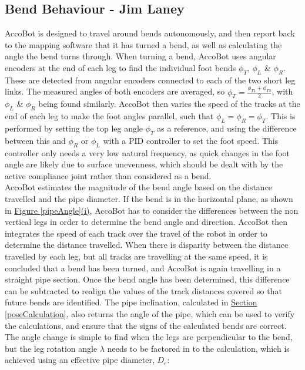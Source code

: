 \documentclass[11pt]{article}		%
\newcommand{\sectref}[1]{\hyperref[#1]{Section \ref*{#1}}}     %
\begin{document}
		\subsection[Bend Behaviour]{Bend Behaviour - Jim Laney}
			
			\begin{floatingfigure}[r]{0pt} \end{floatingfigure}
			AccoBot is designed to travel around bends autonomously, and then report back to the mapping software that it has turned a bend, as well as calculating the angle the bend turns through.
			When turning a bend, AccoBot uses angular encoders at the end of each leg to find the individual foot bends $\phi_T$, $\phi_L$ \& $\phi_R$.
			These are detected from angular encoders connected to each of the two short leg links.
			The measured angles of both encoders are averaged, so $\phi_T = \frac{\phi_{T1} + \phi_{T2}}{2}$, with $\phi_L$ \& $\phi_R$ being found similarly.
			AccoBot then varies the speed of the tracks at the end of each leg to make the foot angles parallel, such that $\phi_L = \phi_R = \phi_T$.
			This is performed by setting the top leg angle $\phi_T$ as a reference, and using the difference between this and $\phi_R$ or $\phi_L$ with a PID controller to set the foot speed.
			This controller only needs a very low natural frequency, as quick changes in the foot angle are likely due to surface unevenness, which should be dealt with by the active compliance joint rather than considered as a bend.
            \\
	        \hspace*{2ex}AccoBot estimates the magnitude of the bend angle based on the distance travelled and the pipe diameter.
			If the bend is in the horizontal plane, as shown in \hyperref[pipeAngle]{Figure \ref*{pipeAngle}(i)}, AccoBot has to consider the differences between the non vertical legs in order to determine the bend angle and direction.
			AccoBot then integrates the speed of each track over the travel of the robot in order to determine the distance travelled.
			When there is disparity between the distance travelled by each leg, but all tracks are travelling at the same speed, it is concluded that a bend has been turned, and AccoBot is again travelling in a straight pipe section.
			Once the bend angle has been determined, this difference can be subtracted to realign the values of the track distances covered so that future bends are identified.
			The pipe inclination, calculated in \sectref{poseCalculation}, also returns the angle of the pipe, which can be used to verify the calculations, and ensure that the signs of the calculated bends are correct.	
			\\
	        \hspace*{2ex}The angle change is simple to find when the legs are perpendicular to the bend, but the leg rotation angle $\lambda$ needs to be factored in to the calculation, which is achieved using an effective pipe diameter, $D_{e}$:
			
\end{document}
